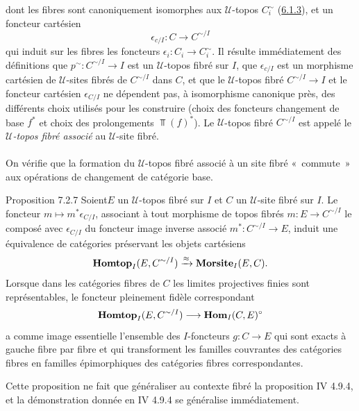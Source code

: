 \documentclass[10pt]{../fichiers-configuration-latex/smfart}
\begin{document}
dont les fibres sont canoniquement isomorphes aux $𝒰$-topos
$C^{\sim}_i$ (\hyperref[VI.subsubsec6.1.3]{6.1.3}), et un foncteur cartésien
\begin{equation*}
\epsilon_{c/I} : C \to C^{\sim /I}\tag{7.2.6.7}
\end{equation*}
qui induit sur les fibres les foncteurs $\epsilon_i : C_{i} \to
C^{\sim}_i$. Il résulte immédiatement des définitions que $p^{\sim} :
C^{\sim/I} \to I$ est un $𝒰$-topos fibré sur $I$, que $\epsilon_{c/I}$
est un morphisme cartésien de $𝒰$-sites fibrés de $C^{\sim/I}$ dans
$C$, et que le $𝒰$-topos fibré $C^{\sim /I} \to I$ et le foncteur
cartésien $\epsilon_{C/I}$ ne dépendent pas, à isomorphisme canonique
près, des différents choix utilisés pour les construire (choix des
foncteurs changement de base $f^{\ast}$ et choix des prolongements
$\Top(f)^{\ast}$). Le $𝒰$-topos fibré $C^{\sim/I}$ est appelé le
\emph{$𝒰$-topos fibré associé} au $𝒰$-site fibré.

\setcounter{paragraph}{7}
\paragraph{}

On vérifie que la formation du $𝒰$-topos fibré associé à un site fibré
« commute » aux opérations de changement de catégorie base.

\begin{enonce*}{Proposition 7.2.7}
Soient\pageoriginale $E$ un $𝒰$-topos fibré sur $I$ et $C$ un
$𝒰$-site fibré sur $I$. Le foncteur $m \mapsto m^{\ast} \epsilon_{C/I}$, associant à tout
morphisme de topos fibrés $m : E \to C^{\sim /I}$ le composé avec
$\epsilon_{C/I}$ du foncteur image inverse associé $m^{\ast} : C^{\sim
/ I} \to E$, induit une équivalence de catégories préservant les
objets cartésiens
$$
\operatorname{\mathbf{Homtop}}_I (E, C^{\sim / I}) \xrightarrow{\approx} \operatorname{\mathbf{Morsite}}_I(E,
C){}.
$$
Lorsque dans les catégories fibres de $C$ les limites projectives
finies sont représentables, le foncteur pleinement fidèle
correspondant
$$
\Hhomtop_{I} (E, C^{\sim/ I}) \to \Hhom_{I} (C, E)^{\circ}
$$
a comme image essentielle l'ensemble des $I$-foncteurs $g : C \to E$
qui sont exacts à gauche fibre par fibre et qui transforment les
familles couvrantes des catégories fibres en familles épimorphiques
des catégories fibres correspondantes.
\end{enonce*}

Cette proposition ne fait que généraliser au contexte fibré la
proposition IV 4.9.4, et la démonstration donnée en IV 4.9.4 se
généralise immédiatement.
\end{document}
